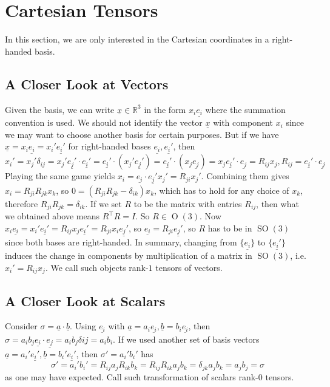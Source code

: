 \section{Cartesian Tensors}
In this section, we are only interested in the Cartesian coordinates in a right-handed basis.
\subsection{A Closer Look at Vectors}
Given the basis, we can write $\underline{x}\in\mathbb R^3$ in the form $x_i\underline{e_i}$ where the summation convention is used.
We should not identify the vector $\underline{x}$ with component $x_i$ since we may want to choose another basis for certain purposes.
But if we have $\underline{x}=x_i\underline{e_i}=x_i'\underline{e_i'}$ for right-handed bases $\underline{e_i},\underline{e_i'}$, then
$$x_i'=x_j'\delta_{ij}=x_j'\underline{e_j'}\cdot\underline{e_i'}=\underline{e_i'}\cdot(x_j'\underline{e_j'})=\underline{e_i'}\cdot(x_j\underline{e_j})=x_j\underline{e_i'}\cdot\underline{e_j}=R_{ij}x_j,R_{ij}=\underline{e_i'}\cdot\underline{e_j}$$
Playing the same game yields $x_i=\underline{e_i}\cdot\underline{e_j'}x_j'=R_{ji}x_j'$.
Combining them gives $x_i=R_{ji}R_{jk}x_k$, so $0=(R_{ji}R_{jk}-\delta_{ik})x_k$, which has to hold for any choice of $x_k$, therefore $R_{ji}R_{jk}=\delta_{ik}$.
If we set $R$ to be the matrix with entries $R_{ij}$, then what we obtained above means $R^\top R=I$.
So $R\in\operatorname{O}(3)$.
Now $x_i\underline{e_i}=x_i'\underline{e_i'}=R_{ij}x_j\underline{e_i'}=R_{ji}x_i\underline{e_j'}$, so $\underline{e_i}=R_{ji}\underline{e_j'}$, so $R$ has to be in $\operatorname{SO}(3)$ since both bases are right-handed.
In summary, changing from $\{\underline{e_i}\}$ to $\{\underline{e_i'}\}$ induces the change in components by multiplication of a matrix in $\operatorname{SO}(3)$, i.e. $x_i'=R_{ij}x_j$.
We call such objects rank-$1$ tensors of vectors.
\subsection{A Closer Look at Scalars}
Consider $\sigma=\underline{a}\cdot\underline{b}$.
Using $\underline{e_i}$ with $\underline{a}=a_i\underline{e_i},\underline{b}=b_i\underline{e_i}$, then $\sigma=a_ib_j\underline{e_i}\cdot\underline{e_j}=a_ib_j\delta{ij}=a_ib_i$.
If we used another set of basis vectors $\underline{a}=a_i'\underline{e_i'},\underline{b}=b_i'\underline{e_i'}$, then $\sigma'=a_i'b_i'$ has
$$\sigma'=a_i'b_i'=R_{ij}a_jR_{ik}b_k=R_{ij}R_{ik}a_jb_k=\delta_{jk}a_jb_k=a_jb_j=\sigma$$
as one may have expected.
Call such transformation of scalars rank-$0$ tensors.
